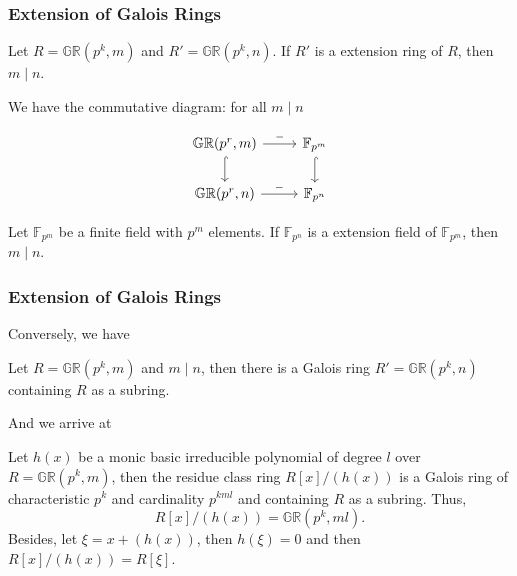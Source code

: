 \documentclass[
    aspectratio=169,                   %
]{beamer}
\renewcommand{\Bbb}{\mathbb}
\newcommand{\Z}{\mathbb{Z}}
\newcommand{\GR}{\mathbb{GR}}
\newcommand{\F}{\mathbb{F}}
\begin{document}
\begin{frame}[fragile]
    \frametitle{Extension of Galois Rings}
        \begin{theorem}
            Let $ R=\GR(p^k,m) $ and $ R'=\GR(p^k,n) $. If $ R' $ is a extension ring of $ R $, 
            then $ m\mid n $.
        \end{theorem}
        We have the commutative diagram: for all $ m\mid n $
        \begin{center}
            \[\begin{tikzcd}
                \GR(p^r,m) \arrow[r,"-"] \arrow[d,hook] & \Bbb F_{p^m} \arrow[d,hook] \\
                \GR(p^r,n) \arrow[r,"-"]  & \Bbb F_{p^n} 
            \end{tikzcd}\]
        \end{center}
        \begin{remark}
            Let $ \F_{p^m} $ be a finite field with $ p^m $ elements. If $ \F_{p^n} $ is a extension field 
            of $ \F_{p^m} $, then $ m\mid n $.
        \end{remark}

\end{frame}
\begin{frame}
    \frametitle{Extension of Galois Rings}

    Conversely, we have 
    \begin{theorem}
        Let $ R=\GR(p^k,m) $ and $ m\mid n $, then there is a Galois ring $ R'=\GR(p^k,n) $ containing
        $ R $ as a subring.
    \end{theorem}
    And we arrive at 
    \begin{theorem}
        Let $ h(x) $ be a monic basic irreducible polynomial of degree $ l $ over $ R=\GR(p^k,m) $,
        then the residue class ring $ R[x]/(h(x)) $ is a Galois ring of characteristic $ p^k $ and cardinality $ p^{kml} $ and containing $ R $ as a subring. Thus,
        \[R[x]/(h(x))=\GR(p^k,ml).\]
        Besides, let $ \xi=x+(h(x)) $, then $ h(\xi)=0  $ and then $ R[x]/(h(x))=R[\xi] $.
    \end{theorem}
\end{frame}
\end{document}
